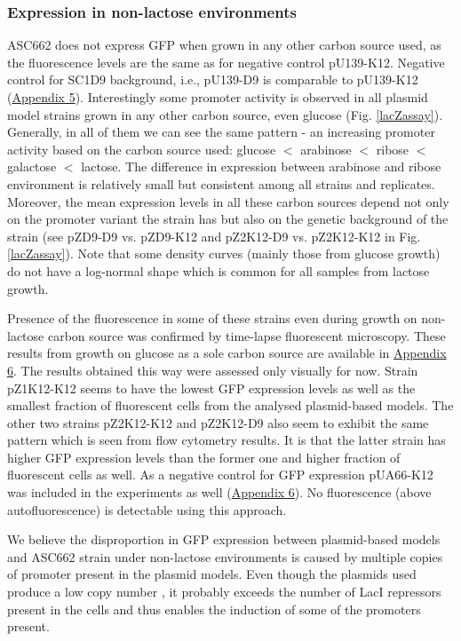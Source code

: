 \subsubsection{Expression in non-lactose environments}
ASC662 does not express GFP when grown in any other carbon source used, as the fluorescence levels are the same as for negative control pU139-K12.
Negative control for SC1\textunderscore D9 background, i.e., pU139-D9 is comparable to pU139-K12 (\hyperlink{FCnegs}{Appendix 5}).
Interestingly some  promoter activity is observed in all plasmid model strains grown in any other carbon source, even glucose (Fig. \ref{lacZassay}).
Generally, in all of them we can see the same pattern - an increasing  promoter activity based on the carbon source used: glucose $<$ arabinose $<$ ribose $<$ galactose $<$ lactose.
The difference in expression between arabinose and ribose environment is relatively small but consistent among all strains and replicates.
Moreover, the mean expression levels in all these carbon sources depend not only on the promoter variant the strain has but also on the genetic background of the strain (see pZ\textunderscore D9-D9 vs. pZ\textunderscore D9-K12 and pZ2\textunderscore K12-D9 vs. pZ2\textunderscore K12-K12 in Fig. \ref{lacZassay}).
Note that some density curves (mainly those from glucose growth) do not have a log-normal shape which is common for all samples from lactose growth.

Presence of the fluorescence in some of these strains even during growth on non-lactose carbon source was confirmed by time-lapse fluorescent microscopy.
These results from growth on glucose as a sole carbon source are available in \hyperlink{micro}{Appendix 6}.
The results obtained this way were assessed only visually for now.
Strain pZ1\textunderscore K12-K12 seems to have the lowest GFP expression levels as well as the smallest fraction of fluorescent cells from the analysed plasmid-based models.
The other two strains pZ2\textunderscore K12-K12 and pZ2\textunderscore K12-D9 also seem to exhibit the same pattern which is seen from flow cytometry results.
It is that the latter strain has higher GFP expression levels than the former one and higher fraction of fluorescent cells as well.
As a negative control for GFP expression pUA66-K12 was included in the experiments as well (\hyperlink{micro}{Appendix 6}).
No fluorescence (above autofluorescence) is detectable using this approach.

We believe the disproportion in GFP expression between plasmid-based models and ASC662 strain under non-lactose environments is caused by multiple copies of  promoter present in the plasmid models.
Even though the plasmids used produce a low copy number \cite{zaslaver2006comprehensive}, it probably exceeds the number of LacI repressors present in the cells and thus enables the induction of some of the  promoters present.

